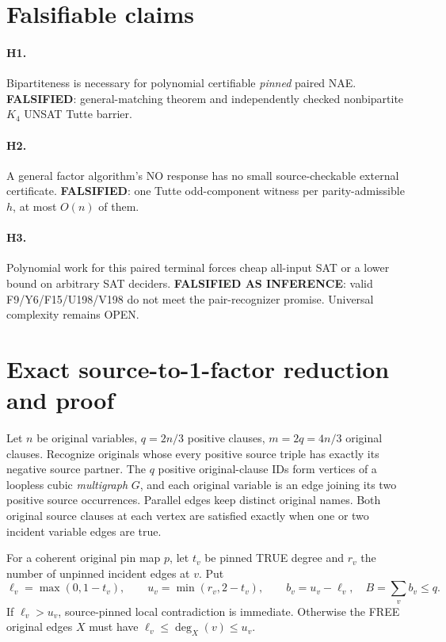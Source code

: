\documentclass[11pt]{article}
\begin{document}
\section{Falsifiable claims}
\paragraph{H1.} Bipartiteness is necessary for polynomial certifiable \emph{pinned} paired NAE. \textbf{FALSIFIED}: general-matching theorem and independently checked nonbipartite $K_4$ UNSAT Tutte barrier.
\paragraph{H2.} A general factor algorithm's NO response has no small source-checkable external certificate. \textbf{FALSIFIED}: one Tutte odd-component witness per parity-admissible $h$, at most $O(n)$ of them.
\paragraph{H3.} Polynomial work for this paired terminal forces cheap all-input SAT or a lower bound on arbitrary SAT deciders. \textbf{FALSIFIED AS INFERENCE}: valid F9/Y6/F15/U198/V198 do not meet the pair-recognizer promise. Universal complexity remains OPEN.

\section{Exact source-to-1-factor reduction and proof}
Let $n$ be original variables, $q=2n/3$ positive clauses, $m=2q=4n/3$ original clauses. Recognize originals whose every positive source triple has exactly its negative source partner. The $q$ positive original-clause IDs form vertices of a loopless cubic \emph{multigraph} $G$, and each original variable is an edge joining its two positive source occurrences. Parallel edges keep distinct original names. Both original source clauses at each vertex are satisfied exactly when one or two incident variable edges are true.

For a coherent original pin map $p$, let $t_v$ be pinned TRUE degree and $r_v$ the number of unpinned incident edges at $v$. Put
\[
 \ell_v=\max(0,1-t_v),\qquad u_v=\min(r_v,2-t_v),\qquad
 b_v=u_v-\ell_v,\quad B=\sum_v b_v\le q.
\]
If $\ell_v>u_v$, source-pinned local contradiction is immediate. Otherwise the FREE original edges $X$ must have $\ell_v\le\deg_X(v)\le u_v$.
\end{document}
